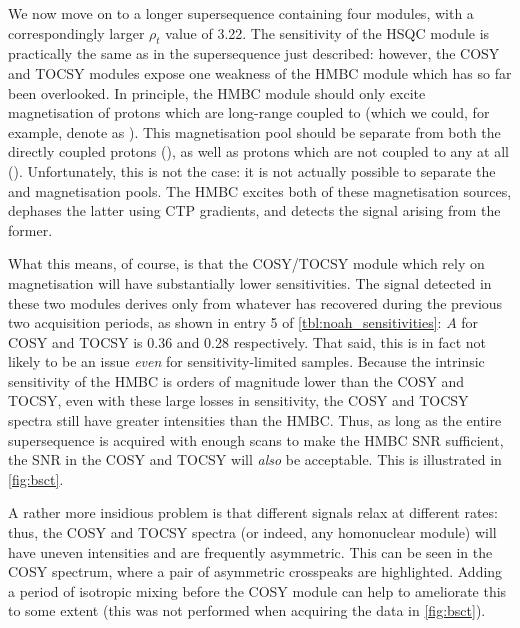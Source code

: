 We now move on to a longer supersequence containing four modules, with a correspondingly larger $\rho_t$ value of 3.22.
The sensitivity of the HSQC module is practically the same as in the  supersequence just described: however, the COSY and TOCSY modules expose one weakness of the HMBC module which has so far been overlooked.
In principle, the HMBC module should only excite magnetisation of protons which are long-range coupled to \carbon{} (which we could, for example, denote as ).
This magnetisation pool should be separate from both the directly coupled protons (), as well as protons which are not coupled to any \carbon{} at all ().
Unfortunately, this is not the case: it is not actually possible to separate the  and  magnetisation pools.
The HMBC excites both of these magnetisation sources, dephases the latter using CTP gradients, and detects the signal arising from the former.

What this means, of course, is that the COSY/TOCSY module which rely on  magnetisation will have substantially lower sensitivities.
The signal detected in these two modules derives only from whatever has recovered during the previous two acquisition periods, as shown in entry 5 of \cref{tbl:noah_sensitivities}: $A$ for COSY and TOCSY is 0.36 and 0.28 respectively.
That said, this is in fact not likely to be an issue \textit{even} for sensitivity-limited samples.
Because the intrinsic sensitivity of the HMBC is orders of magnitude lower than the COSY and TOCSY, even with these large losses in sensitivity, the COSY and TOCSY spectra still have greater intensities than the HMBC.
Thus, as long as the entire supersequence is acquired with enough scans to make the HMBC SNR sufficient, the SNR in the COSY and TOCSY will \textit{also} be acceptable.
This is illustrated in \cref{fig:bsct}.

A rather more insidious problem is that different signals relax at different rates: thus, the COSY and TOCSY spectra (or indeed, any homonuclear module) will have uneven intensities and are frequently asymmetric.
This can be seen in the COSY spectrum, where a pair of asymmetric crosspeaks are highlighted.
Adding a period of isotropic mixing before the COSY module\autocite{Kupce2018CC} can help to ameliorate this to some extent (this was not performed when acquiring the data in \cref{fig:bsct}).

